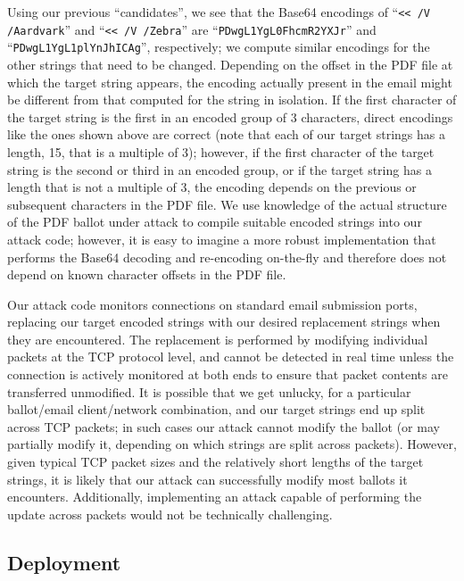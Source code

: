 \documentclass{article}
\begin{document}
Using our previous ``candidates'', we see that the Base64 encodings of
``\texttt{<{}< /V /Aardvark}'' and ``\texttt{<{}< /V
  /Zebra\textvisiblespace\textvisiblespace\textvisiblespace}'' are
``\texttt{PDwgL1YgL0FhcmR2YXJr}'' and
``\texttt{PDwgL1YgL1plYnJhICAg}'', respectively; we compute similar
encodings for the other strings that need to be changed. Depending on
the offset in the PDF file at which the target string appears, the
encoding actually present in the email might be different from that
computed for the string in isolation. If the first character of the
target string is the first in an encoded group of 3 characters, direct
encodings like the ones shown above are correct (note that each of our
target strings has a length, 15, that is a multiple of 3); however, if
the first character of the target string is the second or third in an
encoded group, or if the target string has a length that is not a
multiple of 3, the encoding depends on the previous or subsequent
characters in the PDF file. We use knowledge of the actual structure
of the PDF ballot under attack to compile suitable encoded strings
into our attack code; however, it is easy to imagine a more robust
implementation that performs the Base64 decoding and re-encoding
on-the-fly and therefore does not depend on known character offsets in
the PDF file.

Our attack code monitors connections on standard email submission
ports, replacing our target encoded strings with our desired
replacement strings when they are encountered. The replacement is
performed by modifying individual packets at the TCP protocol level,
and cannot be detected in real time unless the connection is actively
monitored at both ends to ensure that packet contents are transferred
unmodified. It is possible that we get unlucky, for a particular
ballot/email client/network combination, and our target strings end up
split across TCP packets; in such cases our attack cannot modify the
ballot (or may partially modify it, depending on which strings are
split across packets). However, given typical TCP packet sizes and the
relatively short lengths of the target strings, it is likely that our
attack can successfully modify most ballots it encounters.
Additionally, implementing an attack capable of performing the update
across packets would not be technically challenging.

\subsection{Deployment}
\end{document}
